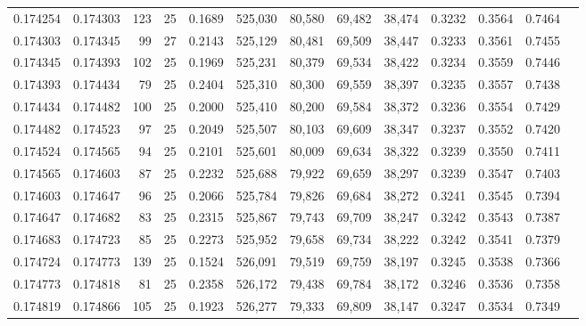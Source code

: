 \begin{tabular}{rrrrrrrrrrrrr}
0.174254 & 0.174303 &   123 &  25 &                                     0.1689 & 525,030 &  80,580 &  69,482 &  38,474 & 0.3232 & 0.3564 & 0.7464 \\
0.174303 & 0.174345 &    99 &  27 &                                     0.2143 & 525,129 &  80,481 &  69,509 &  38,447 & 0.3233 & 0.3561 & 0.7455 \\
0.174345 & 0.174393 &   102 &  25 &                                     0.1969 & 525,231 &  80,379 &  69,534 &  38,422 & 0.3234 & 0.3559 & 0.7446 \\
0.174393 & 0.174434 &    79 &  25 &                                     0.2404 & 525,310 &  80,300 &  69,559 &  38,397 & 0.3235 & 0.3557 & 0.7438 \\
0.174434 & 0.174482 &   100 &  25 &                                     0.2000 & 525,410 &  80,200 &  69,584 &  38,372 & 0.3236 & 0.3554 & 0.7429 \\
0.174482 & 0.174523 &    97 &  25 &                                     0.2049 & 525,507 &  80,103 &  69,609 &  38,347 & 0.3237 & 0.3552 & 0.7420 \\
0.174524 & 0.174565 &    94 &  25 &                                     0.2101 & 525,601 &  80,009 &  69,634 &  38,322 & 0.3239 & 0.3550 & 0.7411 \\
0.174565 & 0.174603 &    87 &  25 &                                     0.2232 & 525,688 &  79,922 &  69,659 &  38,297 & 0.3239 & 0.3547 & 0.7403 \\
0.174603 & 0.174647 &    96 &  25 &                                     0.2066 & 525,784 &  79,826 &  69,684 &  38,272 & 0.3241 & 0.3545 & 0.7394 \\
0.174647 & 0.174682 &    83 &  25 &                                     0.2315 & 525,867 &  79,743 &  69,709 &  38,247 & 0.3242 & 0.3543 & 0.7387 \\
0.174683 & 0.174723 &    85 &  25 &                                     0.2273 & 525,952 &  79,658 &  69,734 &  38,222 & 0.3242 & 0.3541 & 0.7379 \\
0.174724 & 0.174773 &   139 &  25 &                                     0.1524 & 526,091 &  79,519 &  69,759 &  38,197 & 0.3245 & 0.3538 & 0.7366 \\
0.174773 & 0.174818 &    81 &  25 &                                     0.2358 & 526,172 &  79,438 &  69,784 &  38,172 & 0.3246 & 0.3536 & 0.7358 \\
0.174819 & 0.174866 &   105 &  25 &                                     0.1923 & 526,277 &  79,333 &  69,809 &  38,147 & 0.3247 & 0.3534 & 0.7349 \\

\end{tabular}
